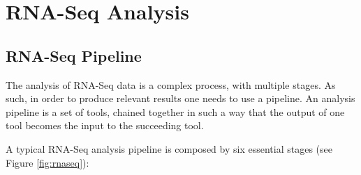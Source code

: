 \section{RNA-Seq Analysis}


\subsection{RNA-Seq Pipeline}

The analysis of RNA-Seq data is a complex process, with multiple stages. As
such, in order to produce relevant results one needs to use a pipeline. An
analysis pipeline is a set of tools, chained together in such a way that the
output of one tool becomes the input to the succeeding tool.

A typical RNA-Seq analysis pipeline is composed by six essential stages
\cite{rnaseqpipeline} (see Figure \ref{fig:rnaseq}):


